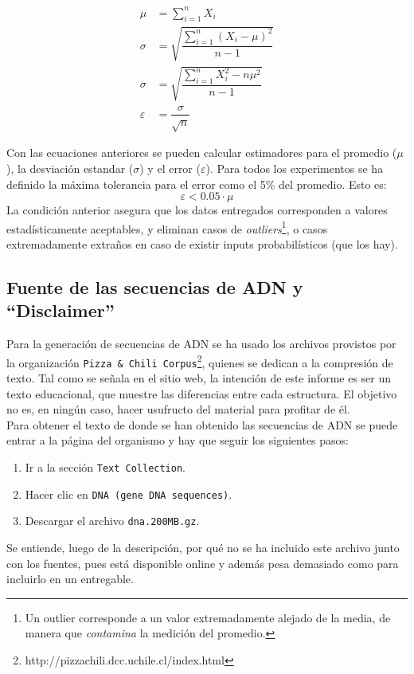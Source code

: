 \documentclass[12pt,letterpaper]{report}
\begin{document}
\begin{align}
  \mu &= \sum_{i=1}^n X_i \nonumber \\
  \sigma &= \sqrt{\dfrac{\sum_{i=1}^n (X_i - \mu)^{2}}{n-1}} \nonumber \\
  \sigma &= \sqrt{\dfrac{\sum_{i=1}^n X_i^2 - n\mu^2}{n-1}} \nonumber \\
  \varepsilon &= \dfrac{\sigma}{\sqrt{n}} \nonumber
\end{align}

Con las ecuaciones anteriores se pueden calcular estimadores para el promedio ($\mu$), la desviación estandar ($\sigma$) y el error ($\varepsilon$). Para todos los experimentos se ha definido la máxima tolerancia para el error como el 5\% del promedio. Esto es:
$$\varepsilon < 0.05\cdot \mu$$
La condición anterior asegura que los datos entregados corresponden a valores estadísticamente aceptables, y eliminan casos de \emph{outliers}\footnote{Un outlier corresponde a un valor extremadamente alejado de la media, de manera que \emph{contamina} la medición del promedio.}, o casos extremadamente extraños en caso de existir inputs probabilísticos (que los hay).

\subsection{Fuente de las secuencias de ADN y ``Disclaimer''}
\label{subsec:fuente_textos}

Para la generación de secuencias de ADN se ha usado los archivos provistos por la organización \texttt{Pizza \& Chili Corpus}\footnote{http://pizzachili.dcc.uchile.cl/index.html}, quienes se dedican a la compresión de texto. Tal como se señala en el sitio web, la intención de este informe es ser un texto educacional, que muestre las diferencias entre cada estructura. El objetivo no es, en ningún caso, hacer usufructo del material para profitar de él.\\

Para obtener el texto de donde se han obtenido las secuencias de ADN se puede entrar a la página del organismo y hay que seguir los siguientes pasos:
\begin{enumerate}
\item Ir a la sección \texttt{Text Collection}.
\item Hacer clic en \texttt{DNA (gene DNA sequences)}.
\item Descargar el archivo \texttt{dna.200MB.gz}.
\end{enumerate}

Se entiende, luego de la descripción, por qué no se ha incluido este archivo junto con los fuentes, pues está disponible online y además pesa demasiado como para incluirlo en un entregable.
\end{document}
